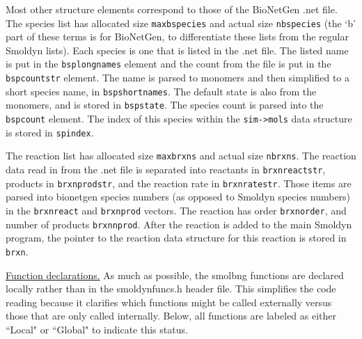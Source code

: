 \documentclass {scrbook}
\newcommand {\ttt} {\texttt}
\begin{document}
Most other structure elements correspond to those of the BioNetGen .net file. The species list has allocated size \ttt{maxbspecies} and actual size \ttt{nbspecies} (the `b' part of these terms is for BioNetGen, to differentiate these lists from the regular Smoldyn lists). Each species is one that is listed in the .net file. The listed name is put in the \ttt{bsplongnames} element and the count from the file is put in the \ttt{bspcountstr} element. The name is parsed to monomers and then simplified to a short species name, in \ttt{bspshortnames}. The default state is also from the monomers, and is stored in \ttt{bspstate}. The species count is parsed into the \ttt{bspcount} element. The index of this species within the \ttt{sim->mols} data structure is stored in \ttt{spindex}.

The reaction list has allocated size \ttt{maxbrxns} and actual size \ttt{nbrxns}. The reaction data read in from the .net file is separated into reactants in \ttt{brxnreactstr}, products in \ttt{brxnprodstr}, and the reaction rate in \ttt{brxnratestr}. Those items are parsed into bionetgen species numbers (as opposed to Smoldyn species numbers) in the \ttt{brxnreact} and \ttt{brxnprod} vectors. The reaction has order \ttt{brxnorder}, and number of products \ttt{brxnnprod}. After the reaction is added to the main Smoldyn program, the pointer to the reaction data structure for this reaction is stored in \ttt{brxn}.

\underline{Function declarations.}
As much as possible, the smolbng functions are declared locally rather than in the smoldynfuncs.h header file. This simplifies the code reading because it clarifies which functions might be called externally versus those that are only called internally. Below, all functions are labeled as either ``Local" or ``Global" to indicate this status.
\end{document}
